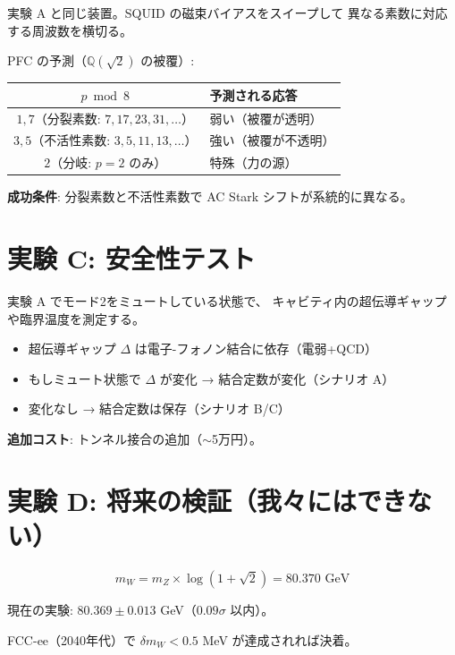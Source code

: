 \documentclass[12pt,a4paper]{article}
\begin{document}
\begin{expbox}[素数の分裂パターンで応答は変わるか]
実験 A と同じ装置。SQUID の磁束バイアスをスイープして
異なる素数に対応する周波数を横切る。

PFC の予測（$\mathbb{Q}(\sqrt{2})$ の被覆）:

\begin{center}
\renewcommand{\arraystretch}{1.3}
\begin{tabular}{cl}
\toprule
$p \bmod 8$ & 予測される応答 \\
\midrule
$1, 7$（分裂素数: $7, 17, 23, 31, \ldots$） & 弱い（被覆が透明） \\
$3, 5$（不活性素数: $3, 5, 11, 13, \ldots$） & 強い（被覆が不透明） \\
$2$（分岐: $p=2$ のみ） & 特殊（力の源） \\
\bottomrule
\end{tabular}
\end{center}

\textbf{成功条件}: 分裂素数と不活性素数で AC Stark シフトが系統的に異なる。
\end{expbox}

\section{実験 C: 安全性テスト}

\begin{expbox}[結合定数は変わるか]
実験 A でモード2をミュートしている状態で、
キャビティ内の超伝導ギャップや臨界温度を測定する。

\begin{itemize}
\item 超伝導ギャップ $\Delta$ は電子-フォノン結合に依存（電弱+QCD）
\item もしミュート状態で $\Delta$ が変化 → 結合定数が変化（シナリオ A）
\item 変化なし → 結合定数は保存（シナリオ B/C）
\end{itemize}

\textbf{追加コスト}: トンネル接合の追加（$\sim$5万円）。
\end{expbox}

\section{実験 D: 将来の検証（我々にはできない）}

\begin{expbox}[$m_W$ の精密測定]
$$m_W = m_Z \times \log(1+\sqrt{2}) = 80.370 \text{ GeV}$$

現在の実験: $80.369 \pm 0.013$ GeV（$0.09\sigma$ 以内）。

FCC-ee（2040年代）で $\delta m_W < 0.5$ MeV が達成されれば決着。
\end{expbox}
\end{document}
